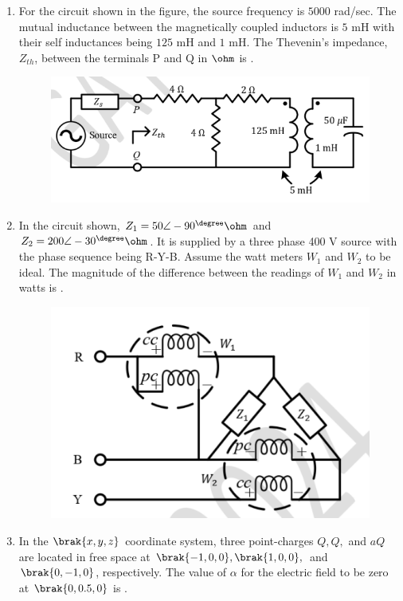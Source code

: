 \documentclass[journal,12pt,onecolumn]{IEEEtran}
\theoremstyle{remark}
\begin{document}
\begin{enumerate}[start=1, label=Q.\arabic*]
    \item For the circuit shown in the figure, the source frequency is $5000$ rad/sec. The mutual inductance between the magnetically coupled inductors is $5$ mH with their self inductances being $125$ mH and $1$ mH. The Thevenin's impedance, $Z_{th}$, between the terminals P and Q in $\ohm$ is \underline{\hspace{2cm}} .
    \begin{figure}[H]
        \includegraphics[width=0.8\columnwidth]{Figures/q49.png}
        \centering
        \caption{}
    \end{figure}
    \hfill{}

    \item In the circuit shown, $Z_1 = 50\angle-90^\degree \ohm$ and $Z_2 = 200\angle-30^\degree \ohm$. It is supplied by a three phase 400 V source with the phase sequence being R-Y-B. Assume the watt meters $W_1$ and $W_2$ to be ideal. The magnitude of the difference between the readings of $W_1$ and $W_2$ in watts is \underline{\hspace{2cm}} .
    \begin{figure}[H]
        \includegraphics[width=0.6\columnwidth]{Figures/q50.png}
        \centering
        \caption{}
    \end{figure}

    \hfill{}

    \item In the $\brak{x, y, z}$ coordinate system, three point-charges $Q, Q,$ and $aQ$ are located in free space at $\brak{-1, 0, 0}, \brak{1, 0, 0},$ and $\brak{0, -1, 0}$, respectively. The value of $\alpha$ for the electric field to be zero at $\brak{0, 0.5, 0}$ is \underline{\hspace{2cm}} .


\end{enumerate}
\end{document}
